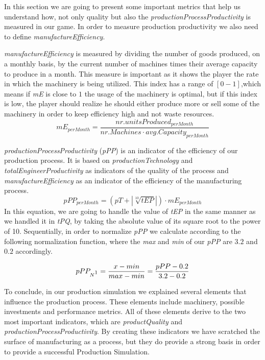 In this section we are going to present some important metrics that help us understand how, not only quality but also the \textit{productionProcessProductivity} is measured in our game. In order to measure production productivity we also need to define  \textit{manufactureEfficiency}. 

\textit{manufactureEfficiency} is measured by dividing the number of goods produced, on a monthly basis, by the current number of machines times their average capacity to produce in a month. This measure is important as it shows the player the rate in which the machinery is being utilized. This index has a range of $[0-1]$,which means if \textit{mE} is close to $1$ the usage of the machinery is optimal, but if this index is low, the player should realize he should either produce more or sell some of the machinery in order to keep efficiency high and not waste resources.
\begin{equation}
mE_{perMonth}= \frac{nr. units Produced_{perMonth}}{nr. Machines\cdot avg. Capacity_{perMonth}}  
\label{eq: ME}
\end{equation}

\textit{productionProcessProductivity} (\textit{pPP}) is an indicator of the efficiency of our production  process. It is based on \textit{productionTechnology} and \textit{totalEngineerProductivity} as indicators of the quality of the process and \textit{manufactureEfficiency} as an indicator of the efficiency of the manufacturing process.
\begin{equation}
pPP_{perMonth}= (pT + |\sqrt[10]{tEP}|) \cdot mE_{perMonth}
\label{eq:PPP}
\end{equation}
In this equation, we are going to handle the value of \textit{tEP} in the same manner as we handled it in \textit{tPQ}, by taking the absolute value of its square root to the power of 10. Sequentially, in order to normalize \textit{pPP} we calculate according to the following normalization function, where the \textit{max} and \textit{min} of our \textit{pPP} are $3.2$ and $0.2$ accordingly.

\begin{equation}
   pPP_{N\footnotemark}= \frac{x-min}{max-min}=\frac{pPP-0.2}{3.2-0.2}
\end{equation}
 
To conclude, in our production simulation we explained several elements that influence the production process. These elements include machinery, possible investments and performance metrics. All of these elements derive to the two most important indicators, which are \textit{productQuality} and \textit{productionProcessProductivity}. By creating these indicators we have scratched the surface of manufacturing as a process, but they do provide a strong basis in order to provide a successful Production Simulation. 